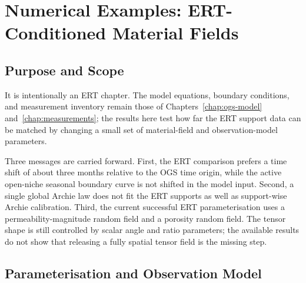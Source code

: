 \chapter{Numerical Examples: ERT-Conditioned Material Fields}
\label{chap:inversion-results}

\section{Purpose and Scope}
\label{sec:inversion-purpose}

  It is intentionally an
ERT chapter.  The model equations, boundary conditions, and measurement inventory
remain those of Chapters~\ref{chap:ogs-model} and~\ref{chap:measurements}; the
results here test how far the ERT support data can be matched by changing a small
set of material-field and observation-model parameters.

Three messages are carried forward.  First, the ERT comparison prefers a time
shift of about three months relative to the OGS time origin, while the active
open-niche seasonal boundary curve is not shifted in the model input.  Second, a
single global Archie law does not fit the ERT supports as well as support-wise
Archie calibration.  Third, the current successful ERT parameterisation uses a
permeability-magnitude random field and a porosity random field.  The tensor shape
is still controlled by scalar angle and ratio parameters; the available results do
not show that releasing a fully spatial tensor field is the missing step.

\section{Parameterisation and Observation Model}
\label{sec:inversion-modelling-choices}


